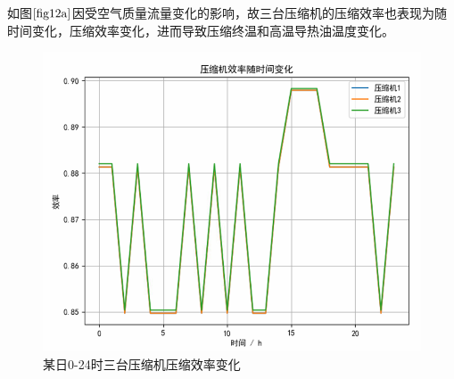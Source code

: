 \documentclass{jnuthesis}
\begin{document}
	\par 如图$ \fontsize{10.5bp}{10pt}\ref{fig12a} $因受空气质量流量变化的影响，故三台压缩机的压缩效率也表现为随时间变化，压缩效率变化，进而导致压缩终温和高温导热油温度变化。
	\begin{figure}[H]
		\centering
		\includegraphics[width=0.7\linewidth]{pictures/screenshot024}
		\caption{\fontsize{10.5bp}{10pt}某日0-24时三台压缩机压缩效率变化}
		\label{fig12a}
	\end{figure}
	
\end{document}
